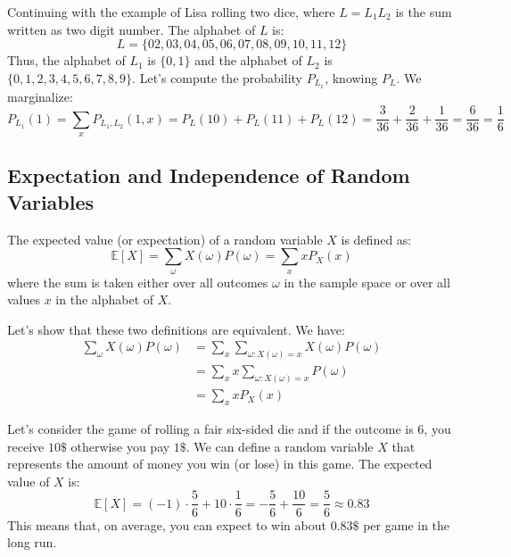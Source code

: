 \begin{eg}
    Continuing with the example of Lisa rolling two dice, where $L = L_1 L_2$ is the sum written as two digit number. The alphabet of $L$ is:
    \[
        L = \{02, 03, 04, 05, 06, 07, 08, 09, 10, 11, 12\}
    \]
    Thus, the alphabet of $L_1$ is $\{0,1\}$ and the alphabet of $L_2$ is $\{0,1,2,3,4,5,6,7,8,9\}$. Let's compute the probability $P_{L_1}$, knowing $P_L$. We marginalize:
    \[
        P_{L_1}(1) = \sum_{x} P_{L_1, L_2}(1,x) = P_L(10) + P_L(11) + P_L(12) = \frac{3}{36} + \frac{2}{36} + \frac{1}{36} = \frac{6}{36} = \frac{1}{6}
    \]
\end{eg}

\subsection{Expectation and Independence of Random Variables}
\begin{definition}
    The expected value (or expectation) of a random variable $X$ is defined as:
    \[
        \mathbb{E}[X] = \sum_{\omega}X(\omega)P(\omega) = \sum_{x} x P_X(x)
    \]
    where the sum is taken either over all outcomes $\omega$ in the sample space or over all values $x$ in the alphabet of $X$.
\end{definition}
Let's show that these two definitions are equivalent. We have:
\begin{align*}
    \sum_{\omega}X(\omega)P(\omega) &= \sum_{x} \sum_{\omega : X(\omega) = x} X(\omega)P(\omega) \\
    &= \sum_{x} x \sum_{\omega : X(\omega) = x} P(\omega) \\
    &= \sum_{x} x P_X(x)
\end{align*}

\begin{eg}
    Let's consider the game of rolling a fair six-sided die and if the outcome is $6$, you receive $10\$$ otherwise you pay $1\$$. We can define a random variable $X$ that represents the amount of money you win (or lose) in this game. The expected value of $X$ is:
    \[
        \mathbb{E}[X] = (-1) \cdot \frac{5}{6} + 10 \cdot \frac{1}{6} = -\frac{5}{6} + \frac{10}{6} = \frac{5}{6} \approx 0.83
    \]
    This means that, on average, you can expect to win about $0.83\$$ per game in the long run.
\end{eg}

